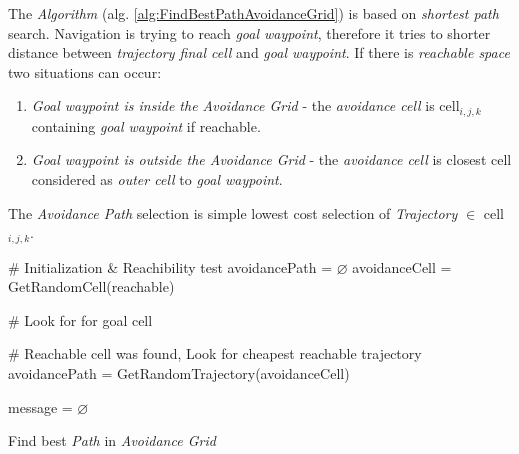 The \emph{Algorithm} (alg. \ref{alg:FindBestPathAvoidanceGrid}) is based on \emph{shortest path} search. Navigation is trying to reach \emph{goal waypoint}, therefore it tries to shorter distance between \emph{trajectory final cell} and \emph{goal waypoint}. If there is \emph{reachable space} two situations can occur:
\begin{enumerate}
    \item \emph{Goal waypoint is inside the Avoidance Grid} - the \emph{avoidance cell} is cell$_{i,j,k}$ containing \emph{goal waypoint} if reachable. 
    
    \item \emph{Goal waypoint is outside the Avoidance Grid} - the \emph{avoidance cell} is closest cell considered as \emph{outer cell} to \emph{goal waypoint}.
\end{enumerate}

The \emph{Avoidance Path} selection is simple lowest cost selection of \emph{Trajectory} $\in$ cell$_{i,j,k}$.


\begin{algorithm}[H]
    
    
    \BlankLine
    \# Initialization \& Reachibility test\;    
    avoidancePath = $\varnothing$\;
    avoidanceCell = GetRandomCell(reachable)\;
    
    \BlankLine
    \# Look for for goal cell\;
    
    \BlankLine
    \# Reachable cell was found, Look for cheapest reachable trajectory\;
    avoidancePath = GetRandomTrajectory(avoidanceCell)\;
   
    message = $\varnothing$\;
    
    \caption{Find best \emph{Path} in \emph{Avoidance Grid}}
    \label{alg:FindBestPathAvoidanceGrid}    
\end{algorithm}

